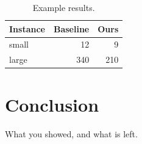 \documentclass[runningheads]{llncs}
\begin{document}
\begin{table}
  \caption{Example results.}\label{tab:res}
  \centering
  \begin{tabular}{lrr}
    \toprule
    Instance & Baseline & Ours \\
    \midrule
    small & 12 & 9 \\
    large & 340 & 210 \\
    \bottomrule
  \end{tabular}
\end{table}

\section{Conclusion}
What you showed, and what is left.



\end{document}
